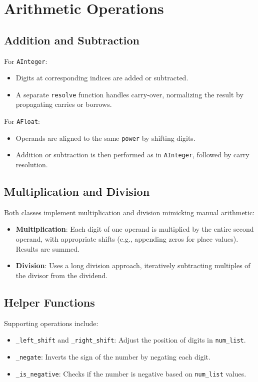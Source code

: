 \documentclass[a4paper,12pt]{article}
\begin{document}
\section{Arithmetic Operations}

\subsection{Addition and Subtraction}
For \texttt{AInteger}:
\begin{itemize}
    \item Digits at corresponding indices are added or subtracted.
    \item A separate \texttt{resolve} function handles carry-over, normalizing the result by propagating carries or borrows.
\end{itemize}
For \texttt{AFloat}:
\begin{itemize}
    \item Operands are aligned to the same \texttt{power} by shifting digits.
    \item Addition or subtraction is then performed as in \texttt{AInteger}, followed by carry resolution.
\end{itemize}

\subsection{Multiplication and Division}
Both classes implement multiplication and division mimicking manual arithmetic:
\begin{itemize}
    \item \textbf{Multiplication}: Each digit of one operand is multiplied by the entire second operand, with appropriate shifts (e.g., appending zeros for place values). Results are summed.
    \item \textbf{Division}: Uses a long division approach, iteratively subtracting multiples of the divisor from the dividend.
\end{itemize}

\subsection{Helper Functions}
Supporting operations include:
\begin{itemize}
    \item \texttt{\_left\_shift} and \texttt{\_right\_shift}: Adjust the position of digits in \texttt{num\_list}.
    \item \texttt{\_negate}: Inverts the sign of the number by negating each digit.
    \item \texttt{\_is\_negative}: Checks if the number is negative based on \texttt{num\_list} values.
\end{itemize}
\end{document}
